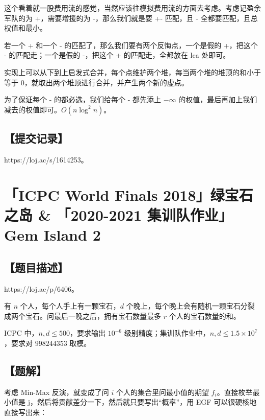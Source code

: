 \documentclass[UTF8,12pt,a4paper]{ctexart}
\begin{document}
	这个看着就一股费用流的感觉，当然应该往模拟费用流的方面去考虑。考虑记盈余军队的为 +，需要增援的为 -，那么我们就是要 +- 匹配，且 - 全都要匹配，且总权值和最小。
	
	若一个 + 和一个 - 的匹配了，那么我们要有两个反悔点，一个是假的 +，把这个 - 的匹配走；一个是假的 -，把这个 + 的匹配走，全都放在 lca 处即可。
	
	实现上可以从下到上启发式合并，每个点维护两个堆，每当两个堆的堆顶的和小于等于 $0$，就取出两个堆顶进行合并，并产生两个新的虚点。
	
	为了保证每个 - 的都必选，我们给每个 - 都先添上 $-\infty$ 的权值，最后再加上我们减去的权值即可。$O(n\log^2n)$。
	
	\subsection*{【提交记录】}
	
	https://loj.ac/s/1614253。
	
	
	\section*{「ICPC World Finals 2018」绿宝石之岛 \& 「2020-2021 集训队作业」Gem Island 2}
	
	\subsection*{【题目描述】}
	
	https://loj.ac/p/6406。
	
	有 $n$ 个人，每个人手上有一颗宝石，$d$ 个晚上，每个晚上会有随机一颗宝石分裂成两个宝石。问最后一晚之后，拥有宝石数量最多 $r$ 个人的宝石数量的和。
	
	ICPC 中，$n,d\le 500$，要求输出 $10^{-6}$ 级别精度；集训队作业中，$n,d\le 1.5\times 10^7$，要求对 $998244353$ 取模。
	
	\subsection*{【题解】}
	
	考虑 Min-Max 反演，就变成了问 $i$ 个人的集合里问最小值的期望 $f_i$。直接枚举最小值是 j，然后将贡献差分一下，然后就只要写出“概率”，用 EGF 可以很硬核地直接写出来：
	
\end{document}
